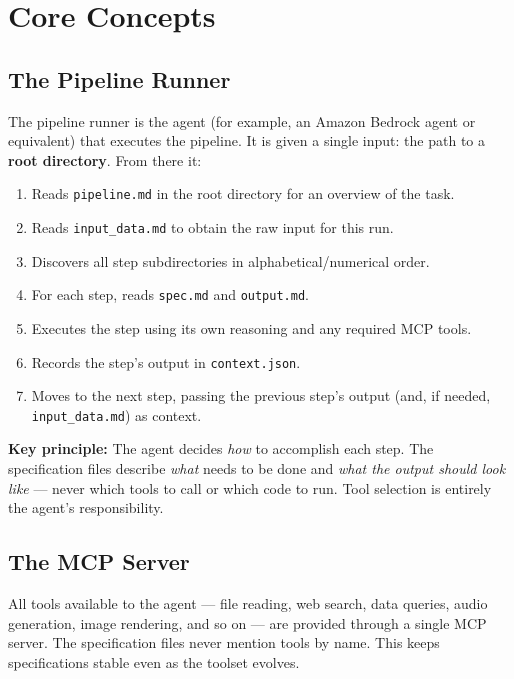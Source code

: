 \documentclass[12pt, a4paper]{article}
\begin{document}
\section{Core Concepts}

\subsection{The Pipeline Runner}

The pipeline runner is the agent (for example, an Amazon Bedrock agent or equivalent) that executes the pipeline. It is given a single input: the path to a \textbf{root directory}. From there it:

\begin{enumerate}[leftmargin=1.5em]
  \item Reads \texttt{pipeline.md} in the root directory for an overview of the task.
  \item Reads \texttt{input\_data.md} to obtain the raw input for this run.
  \item Discovers all step subdirectories in alphabetical/numerical order.
  \item For each step, reads \texttt{spec.md} and \texttt{output.md}.
  \item Executes the step using its own reasoning and any required MCP tools.
  \item Records the step's output in \texttt{context.json}.
  \item Moves to the next step, passing the previous step's output (and, if needed, \texttt{input\_data.md}) as context.
\end{enumerate}

\begin{notebox}
\textbf{Key principle:} The agent decides \textit{how} to accomplish each step. The specification files describe \textit{what} needs to be done and \textit{what the output should look like} — never which tools to call or which code to run. Tool selection is entirely the agent's responsibility.
\end{notebox}

\subsection{The MCP Server}

All tools available to the agent — file reading, web search, data queries, audio generation, image rendering, and so on — are provided through a single MCP server. The specification files never mention tools by name. This keeps specifications stable even as the toolset evolves.
\end{document}
